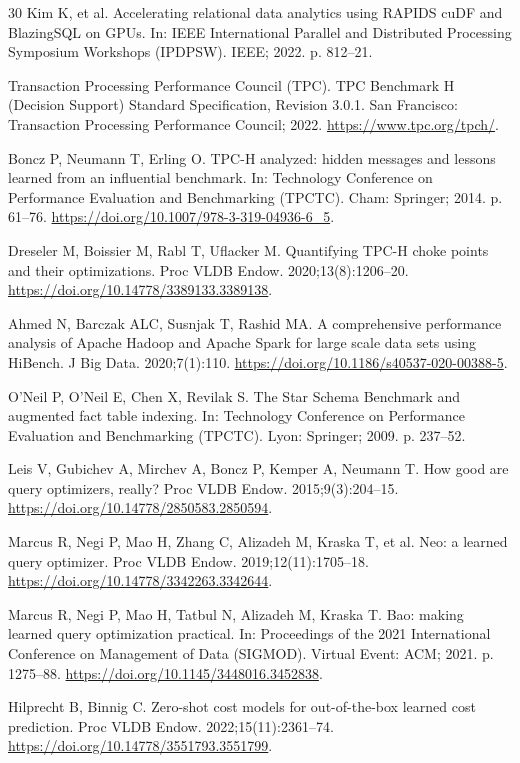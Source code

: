 \documentclass[10pt,a4paper]{article}
\begin{document}
{\begin{thebibliography}{30}
Kim K, et al. Accelerating relational data analytics using RAPIDS cuDF and BlazingSQL on GPUs. In: IEEE International Parallel and Distributed Processing Symposium Workshops (IPDPSW). IEEE; 2022. p. 812--21.

Transaction Processing Performance Council (TPC). TPC Benchmark H (Decision Support) Standard Specification, Revision 3.0.1. San Francisco: Transaction Processing Performance Council; 2022. \url{https://www.tpc.org/tpch/}.

Boncz P, Neumann T, Erling O. TPC-H analyzed: hidden messages and lessons learned from an influential benchmark. In: Technology Conference on Performance Evaluation and Benchmarking (TPCTC). Cham: Springer; 2014. p. 61--76. \url{https://doi.org/10.1007/978-3-319-04936-6_5}.

Dreseler M, Boissier M, Rabl T, Uflacker M. Quantifying TPC-H choke points and their optimizations. Proc VLDB Endow. 2020;13(8):1206--20. \url{https://doi.org/10.14778/3389133.3389138}.

Ahmed N, Barczak ALC, Susnjak T, Rashid MA. A comprehensive performance analysis of Apache Hadoop and Apache Spark for large scale data sets using HiBench. J Big Data. 2020;7(1):110. \url{https://doi.org/10.1186/s40537-020-00388-5}.

O'Neil P, O'Neil E, Chen X, Revilak S. The Star Schema Benchmark and augmented fact table indexing. In: Technology Conference on Performance Evaluation and Benchmarking (TPCTC). Lyon: Springer; 2009. p. 237--52.

Leis V, Gubichev A, Mirchev A, Boncz P, Kemper A, Neumann T. How good are query optimizers, really? Proc VLDB Endow. 2015;9(3):204--15. \url{https://doi.org/10.14778/2850583.2850594}.

Marcus R, Negi P, Mao H, Zhang C, Alizadeh M, Kraska T, et al. Neo: a learned query optimizer. Proc VLDB Endow. 2019;12(11):1705--18. \url{https://doi.org/10.14778/3342263.3342644}.

Marcus R, Negi P, Mao H, Tatbul N, Alizadeh M, Kraska T. Bao: making learned query optimization practical. In: Proceedings of the 2021 International Conference on Management of Data (SIGMOD). Virtual Event: ACM; 2021. p. 1275--88. \url{https://doi.org/10.1145/3448016.3452838}.

Hilprecht B, Binnig C. Zero-shot cost models for out-of-the-box learned cost prediction. Proc VLDB Endow. 2022;15(11):2361--74. \url{https://doi.org/10.14778/3551793.3551799}.


\end{thebibliography}}
\end{document}
